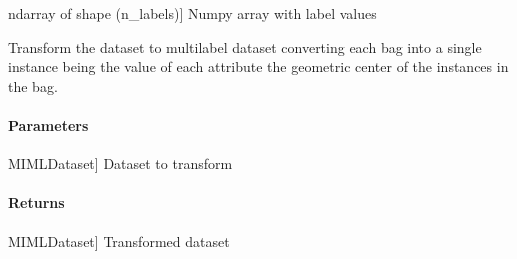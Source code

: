 \documentclass[letterpaper,10pt,english]{sphinxmanual}
\begin{document}
\begin{fulllineitems}
\begin{fulllineitems}
\begin{description}
\sphinxlineitem{labels}{[}ndarray of shape (n\_labels){]}
\sphinxAtStartPar
Numpy array with label values

\end{description}

\end{fulllineitems}


\begin{fulllineitems}
\label{\detokenize{transformation/mimlTOml/_autosummary/miml.transformation.mimlTOml.geometric.GeometricTransformation:miml.transformation.mimlTOml.geometric.GeometricTransformation.transform_dataset}}
\pysigstartsignatures
{}
\pysigstopsignatures
\sphinxAtStartPar
Transform the dataset to multilabel dataset converting each bag into a single instance being the value of each
attribute the geometric center of the instances in the bag.


\paragraph{Parameters}
\label{\detokenize{transformation/mimlTOml/_autosummary/miml.transformation.mimlTOml.geometric.GeometricTransformation:id1}}\begin{description}
\sphinxlineitem{dataset}{[}MIMLDataset{]}
\sphinxAtStartPar
Dataset to transform

\end{description}


\paragraph{Returns}
\label{\detokenize{transformation/mimlTOml/_autosummary/miml.transformation.mimlTOml.geometric.GeometricTransformation:id2}}\begin{description}
\sphinxlineitem{transformed\_dataset}{[}MIMLDataset{]}
\sphinxAtStartPar
Transformed dataset

\end{description}

\end{fulllineitems}


\end{fulllineitems}
\end{document}
